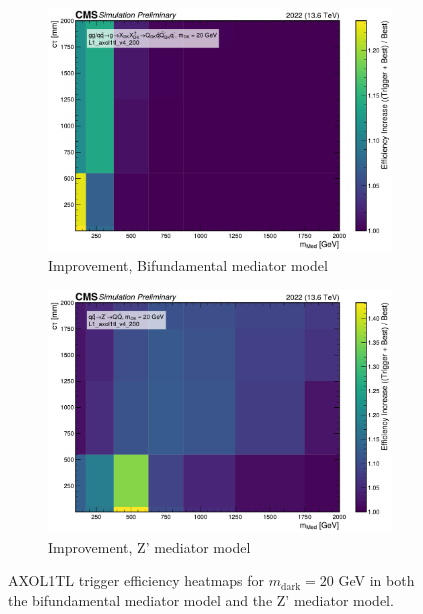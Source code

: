\begin{figure}[h]
  \vspace{1em}

  \begin{subfigure}[t]{0.45\textwidth}
    \centering
    \includegraphics[width=\linewidth]{images/L1/ad_2D_tchan/trigeffplots2D_L1_efftype-improv_t-channel_mDark-20_L1_axol1tl_v4_200_study_cloppear.pdf}
    \caption{Improvement, Bifundamental mediator model}
    \label{fig:axol1tl_improv_tchan}
  \end{subfigure}
  \hfill
  \begin{subfigure}[t]{0.45\textwidth}
    \centering
    \includegraphics[width=\linewidth]{images/L1/ad_2D_schan/trigeffplots2D_L1_efftype-improv_s-channel_mDark-20_L1_axol1tl_v4_200_study_cloppear.pdf}
    \caption{Improvement, Z' mediator model}
    \label{fig:axol1tl_improv_schan}
  \end{subfigure}

  \caption{AXOL1TL trigger efficiency heatmaps for $m_\mathrm{dark} = 20$ GeV in both the bifundamental mediator model and the Z' mediator model.}
  \label{fig:axol1tl_eff}
\end{figure}

